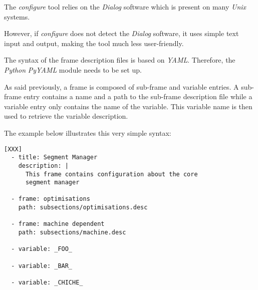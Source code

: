 

The \textit{configure} tool relies on the \textit{Dialog} software which
is present on many \textit{Unix} systems.

However, if \textit{configure} does not detect the \textit{Dialog} software,
it uses simple text input and output, making the tool much less user-friendly.



The syntax of the frame description files is based on \textit{YAML}. Therefore,
the \textit{Python} \textit{PyYAML} module needs to be set up.

As said previously, a frame is composed of sub-frame and variable entries. A
sub-frame entry contains a name and a path to the sub-frame description file
while a variable entry only contains the name of the variable. This variable
name is then used to retrieve the variable description.

The example below illustrates this very simple syntax:

\begin{verbatim}
[XXX]
  - title: Segment Manager
    description: |
      This frame contains configuration about the core
      segment manager

  - frame: optimisations
    path: subsections/optimisations.desc

  - frame: machine dependent
    path: subsections/machine.desc

  - variable: _FOO_

  - variable: _BAR_

  - variable: _CHICHE_
\end{verbatim}
